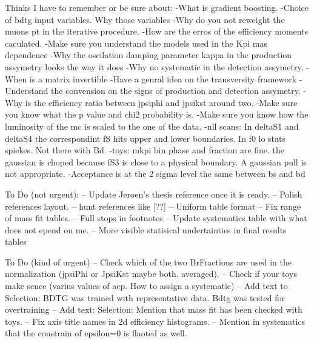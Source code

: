 
Thinks I have to remember or be sure about:
-What is gradient boosting.
-Choice of bdtg input variables. Why those variables
-Why do you not reweight the muons pt in the iterative procedure.
-How are the erros of the efficiency moments caculated.
-Make sure you understand the models used in the Kpi mas dependence
-Why the oscilation damping parameter kappa in the production assymetry looks the way it does 
-Why no systematic in the detection assymetry.
-When is a matrix invertible
-Have a genral idea on the transversity framework
-Understand the convension on the signs of production and detection assymetry.
-Why is the efficiency ratio between jpsiphi and jpsikst around two.
-Make sure you know what the p value and chi2 probability is.
-Make sure you know how the luminosity of the mc is scaled to the one of the data.
-nll scans: 
    In deltaS1 and deltaS4 the correspondint fS hits upper and lower boundaries.
    In f0 lo stats spiekes. Not there with Bd. 
-toys:
    mkpi bin phase and fraction are fine. the gaussian is choped because fS3 is close to a physical boundary. A gaussian pull is not appropriate.
-Acceptance is at the 2 sigma level the same between bs and bd

To Do (not urgent):
-- Update Jeroen's thesis reference once it is ready.
-- Polish references layout.
-- hunt references like [??]
-- Uniform table format
-- Fix range of mass fit tables.
-- Full stops in footnotes
-- Update systematics table with what does not epend on me.
-- More visible statisical undertainties in final results tables 

To Do (kind of urgent)
-- Check which of the two BrFractions are used in the normalization (jpsiPhi or JpsiKst maybe both. averaged).
-- Check if your toys make sence (varius values of acp. How to assign a systematic)
-- Add text to Selection: BDTG was trained with representative data. Bdtg was tested for overtraining
-- Add text: Selection: Mention that mass fit has been checked with toys.
-- Fix axis title names in 2d efficiency histograms.
-- Mention in systematics that the constrain of epsilon=0 is flaoted as well.

